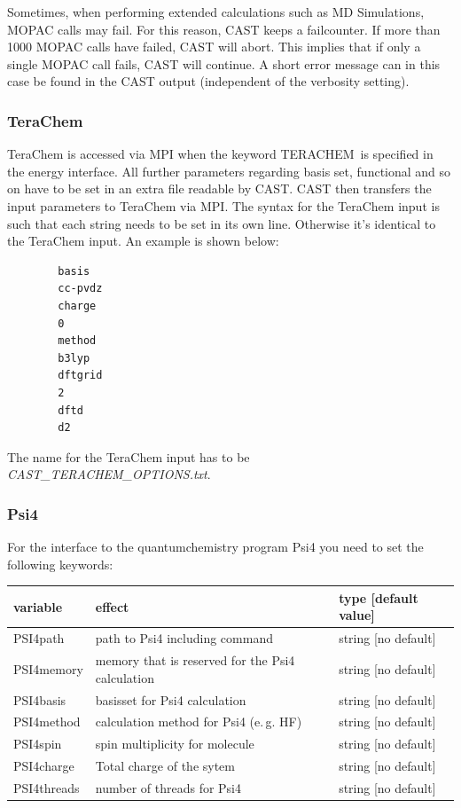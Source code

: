 \documentclass[10pt,a4paper]{article} %
\begin{document}
		Sometimes, when performing extended calculations such as \ac{MD} Simulations, \ac{MOPAC} calls may fail. For this reason, \ac{CAST} keeps a failcounter. If more than 1000 \ac{MOPAC} calls have failed, \ac{CAST} will abort. This implies that if only a single \ac{MOPAC} call fails, \ac{CAST} will continue. A short error message can in this case be found in the \ac{CAST} output (independent of the verbosity setting).
		
		\subsubsection{TeraChem}
		
		
		TeraChem\supercite{terachem} is accessed via \ac{MPI}\supercite{mpi} when the keyword \glqq TERACHEM\grqq~is specified in the energy interface. All further parameters regarding basis set, functional and so on have to be set in an extra file readable by \ac{CAST}. \ac{CAST} then transfers the input parameters to TeraChem via \ac{MPI}. The syntax for the TeraChem input is such that each string needs to be set in its own line. Otherwise it's identical to the TeraChem input. An example is shown below:

		\begin{lstlisting}
		basis
		cc-pvdz
		charge
		0
		method
		b3lyp
		dftgrid
		2
		dftd
		d2\end{lstlisting}

		The name for the TeraChem input has to be \glqq \textit{CAST\_TERACHEM\_OPTIONS.txt}\grqq.
		
		\subsubsection{Psi4}
		
		For the interface to the quantumchemistry program Psi4 you need to set the following keywords:
		
			\begin{longtable}{|p{3cm}|p{5cm}|p{3cm}|}
		variable & effect & type [default value] \\
		\hline
			PSI4path  & path to Psi4 including command & string [no default]\\
			PSI4memory  & memory that is reserved for the Psi4 calculation & string [no default]\\
			PSI4basis & basisset for Psi4 calculation & string [no default]\\
			PSI4method & calculation method for Psi4 (e.\,g. HF) &  string [no default]\\
            PSI4spin & spin multiplicity for molecule & string [no default]\\
			PSI4charge   & Total charge of the sytem &string [no default] \\
			PSI4threads   & number of threads for Psi4 &string [no default] \\
		\end{longtable}
	
\end{document}
